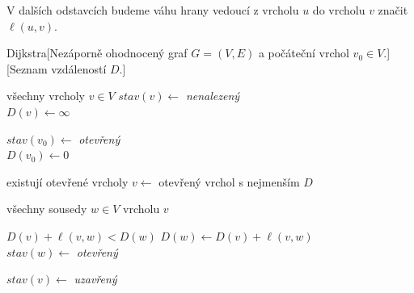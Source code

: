 V dalších odstavcích budeme váhu hrany vedoucí z vrcholu $u$ do vrcholu $v$ značit $\ell(u,v)$.
\begin{pseudo}{Dijkstra}[Nezáporně ohodnocený graf $G=(V,E)$ a počáteční vrchol $v_0\in V$.][Seznam vzdáleností $D$.]
    \begin{For}{všechny vrcholy $v\in V$}
        $stav(v)\gets$ \textit{nenalezený}\\
        $D(v)\gets\infty$\\
    \end{For}
    $stav(v_0)\gets$ \textit{otevřený}\\
    $D(v_0)\gets 0$\\
    \begin{While}{existují otevřené vrcholy}
        $v\gets$ otevřený vrchol s nejmenším $D$\\

        \begin{For}{všechny sousedy $w\in V$ vrcholu $v$}
            \begin{If}{$D(v)+\ell(v,w)<D(w)$}
                $D(w)\gets D(v)+\ell(v,w)$\\
                $stav(w)\gets$ \textit{otevřený}
            \end{If}
        \end{For}
        $stav(v)\gets$ \textit{uzavřený}
    \end{While}
\end{pseudo}
